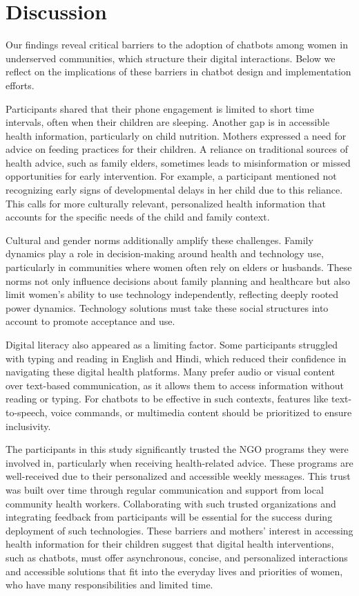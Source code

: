\section{Discussion}

Our findings reveal critical barriers to the adoption of chatbots among women in underserved communities, which structure their digital interactions. 
Below we reflect on the implications of these barriers in chatbot design and implementation efforts.

Participants shared that their phone engagement is limited to short time intervals, often when their children are sleeping. Another gap is in accessible health information, particularly on child nutrition. Mothers expressed a need for advice on feeding practices for their children. A reliance on traditional sources of health advice, such as family elders, sometimes leads to misinformation or missed opportunities for early intervention. For example, a participant mentioned not recognizing early signs of developmental delays in her child due to this reliance. This calls for more culturally relevant, personalized health information that accounts for the specific needs of the child and family context.

Cultural and gender norms additionally amplify these challenges. Family dynamics play a role in decision-making around health and technology use, particularly in communities where women often rely on elders or husbands. These norms not only influence decisions about family planning and healthcare but also limit women's ability to use technology independently, reflecting deeply rooted power dynamics. Technology solutions must take these social structures into account to promote acceptance and use.


Digital literacy also appeared as a limiting factor. Some participants struggled with typing and reading in English and Hindi, which reduced their confidence in navigating these digital health platforms. Many prefer audio or visual content over text-based communication, as it allows them to access information without reading or typing. For chatbots to be effective in such contexts, features like text-to-speech, voice commands, or multimedia content should be prioritized to ensure inclusivity.


The participants in this study significantly trusted the NGO programs they were involved in, particularly when receiving health-related advice. These programs are well-received due to their personalized and accessible weekly messages. This trust was built over time through regular communication and support from local community health workers. Collaborating with such trusted organizations and integrating feedback from participants will be essential for the success during deployment of such technologies.
These barriers and mothers' interest in accessing health information for their children suggest that digital health interventions, such as chatbots, must offer asynchronous, concise, and personalized interactions and accessible solutions that fit into the everyday lives and priorities of women, who have many responsibilities and limited time.

